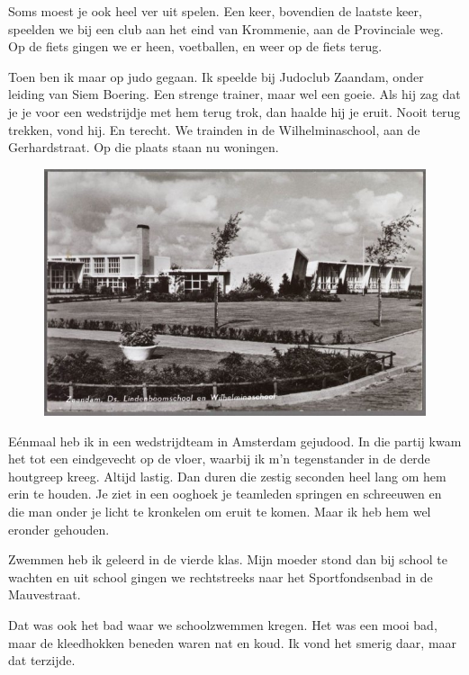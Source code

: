 \documentclass[10pt,twoside, openright]{memoir}
\begin{document}
Soms moest je ook heel ver uit spelen. Een keer, bovendien de laatste keer, speelden we bij een club aan het eind van Krommenie, aan de Provinciale weg. Op de fiets gingen we er heen, voetballen, en weer op de fiets terug. 

Toen ben ik maar op judo gegaan. Ik speelde bij Judoclub Zaandam, onder leiding van Siem Boering. Een strenge trainer, maar wel een goeie. Als hij zag dat je je voor een wedstrijdje met hem terug trok, dan haalde hij je eruit. Nooit terug trekken, vond hij. En terecht. We trainden in de Wilhelminaschool, aan de Gerhardstraat. Op die plaats staan nu woningen.

\begin{figure}
\includegraphics[width=\textwidth]{img/76schooljudo}
\end{figure}

Eénmaal heb ik in een wedstrijdteam in Amsterdam gejudood. In die partij kwam het tot een eindgevecht op de vloer, waarbij ik m’n tegenstander in de derde houtgreep kreeg. Altijd lastig. Dan duren die zestig seconden heel lang om hem erin te houden. Je ziet in een ooghoek je teamleden springen en schreeuwen en die man onder je licht te kronkelen om eruit te komen. Maar ik heb hem wel eronder gehouden. 

Zwemmen heb ik geleerd in de vierde klas. Mijn moeder stond dan bij school te wachten en uit school gingen we rechtstreeks naar het Sportfondsenbad in de Mauvestraat. 

Dat was ook het bad waar we schoolzwemmen kregen. Het was een mooi bad, maar de kleedhokken beneden waren nat en koud. Ik vond het smerig daar, maar dat terzijde. 
\end{document}
